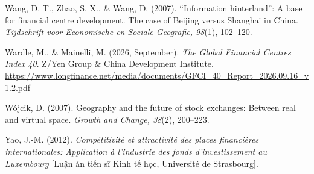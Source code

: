 \begin{list}{}{\setlength{\leftmargin}{1.5em}\setlength{\itemindent}{-1.5em}\setlength{\itemsep}{2pt}\small}
\item Wang, D. T., Zhao, S. X., \& Wang, D. (2007). \enquote{Information hinterland}: A base for financial centre development. The case of Beijing versus Shanghai in China. \emph{Tijdschrift voor Economische en Sociale Geografie, 98}(1), 102–120.
\item Wardle, M., \& Mainelli, M. (2026, September). \emph{The Global Financial Centres Index 40}. Z/Yen Group \& China Development Institute. \url{https://www.longfinance.net/media/documents/GFCI_40_Report_2026.09.16_v1.2.pdf}
\item Wójcik, D. (2007). Geography and the future of stock exchanges: Between real and virtual space. \emph{Growth and Change, 38}(2), 200–223.
\item Yao, J.-M. (2012). \emph{Compétitivité et attractivité des places financières internationales: Application à l’industrie des fonds d’investissement au Luxembourg} [Luận án tiến sĩ Kinh tế học, Université de Strasbourg].
\end{list}
